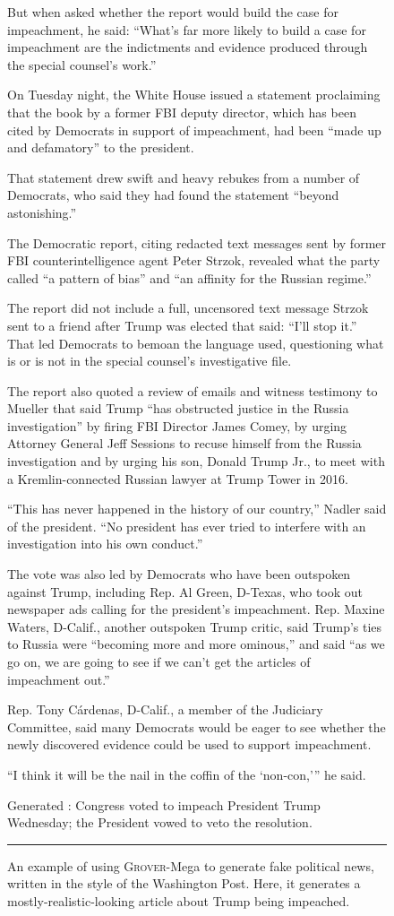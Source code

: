 \documentclass{article}
\newcommand{\modelname}{{\textsc{Grover}}}
\begin{document}
\begin{figure}[t]
{But when asked whether the report would build the case for impeachment, he said: “What’s far more likely to build a case for impeachment are the indictments and evidence produced through the special counsel’s work.”

On Tuesday night, the White House issued a statement proclaiming that the book by a former FBI deputy director, which has been cited by Democrats in support of impeachment, had been “made up and defamatory” to the president.

That statement drew swift and heavy rebukes from a number of Democrats, who said they had found the statement “beyond astonishing.”

The Democratic report, citing redacted text messages sent by former FBI counterintelligence agent Peter Strzok, revealed what the party called “a pattern of bias” and “an affinity for the Russian regime.”

The report did not include a full, uncensored text message Strzok sent to a friend after Trump was elected that said: “I’ll stop it.” That led Democrats to bemoan the language used, questioning what is or is not in the special counsel’s investigative file.

The report also quoted a review of emails and witness testimony to Mueller that said Trump “has obstructed justice in the Russia investigation” by firing FBI Director James Comey, by urging Attorney General Jeff Sessions to recuse himself from the Russia investigation and by urging his son, Donald Trump Jr., to meet with a Kremlin-connected Russian lawyer at Trump Tower in 2016.

“This has never happened in the history of our country,” Nadler said of the president. “No president has ever tried to interfere with an investigation into his own conduct.”

The vote was also led by Democrats who have been outspoken against Trump, including Rep. Al Green, D-Texas, who took out newspaper ads calling for the president’s impeachment. Rep. Maxine Waters, D-Calif., another outspoken Trump critic, said Trump’s ties to Russia were “becoming more and more ominous,” and said “as we go on, we are going to see if we can’t get the articles of impeachment out.”

Rep. Tony Cárdenas, D-Calif., a member of the Judiciary Committee, said many Democrats would be eager to see whether the newly discovered evidence could be used to support impeachment.

“I think it will be the nail in the coffin of the ‘non-con,'” he said.
}

Generated \headlinefield: Congress voted to impeach President Trump Wednesday; the President vowed to veto the resolution. \\

\hrule
\caption{An example of using \modelname-Mega to generate fake political news, written in the style of the Washington Post. Here, it generates a mostly-realistic-looking article about Trump being impeached.}
\label{fig:trumpimpeached}
\end{figure}
 
\end{document}
